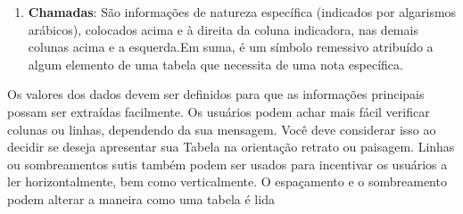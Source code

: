 \begin{enumerate}
\item \textbf{Chamadas}: São informações de natureza específica (indicados por algarismos arábicos), colocados acima e à direita da coluna indicadora, nas demais colunas acima e a esquerda.Em suma, é um símbolo remessivo atribuído a algum elemento de uma tabela que necessita de uma nota específica.
\end{enumerate}



















\newpage
Os valores dos dados devem ser definidos para que as informações principais possam ser extraídas facilmente. Os usuários podem achar mais fácil verificar colunas ou linhas, dependendo da sua mensagem. Você deve considerar isso ao decidir se deseja apresentar sua Tabela na orientação retrato ou paisagem. Linhas ou sombreamentos sutis também podem ser usados para incentivar os usuários a ler horizontalmente, bem como verticalmente. O espaçamento e o sombreamento podem alterar a maneira como uma tabela é lida \vskip0.3cm

